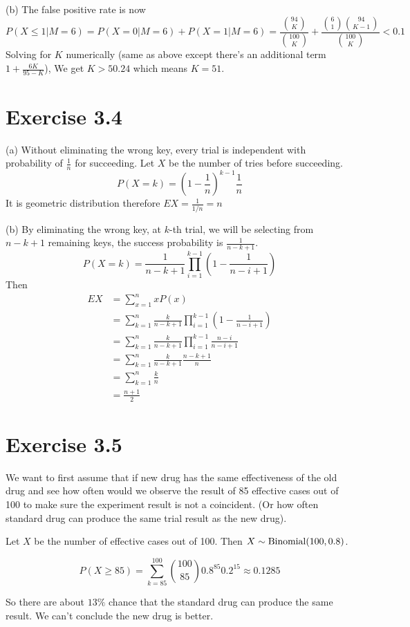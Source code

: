 \documentclass[12pt]{article}
\begin{document}
(b)
The false positive rate is now 
$$P(X\leq 1 | M = 6) = P(X=0|M=6) + P(X=1|M=6)=  \frac{{94 \choose K}}{{100 \choose K}} +  \frac{{6 \choose 1}{94 \choose K-1}}{{100 \choose K}} < 0.1 $$
Solving for $K$ numerically (same as above except there's an additional term $1 + \frac{6K}{95-K}$), We get $K > 50.24$ which means $K=51$.

\section*{Exercise 3.4}
(a) Without eliminating the wrong key, every trial is independent with probability of $\frac{1}{n}$ for succeeding. Let $X$ be the number of tries before succeeding. 
$$P(X=k) = \left(1 - \frac{1}{n}\right)^{k-1} \frac{1}{n}$$
It is geometric distribution therefore $EX = \frac{1}{1/n} = n$

(b) By eliminating the wrong key, at $k$-th trial, we will be selecting from $n - k + 1$ remaining keys, the success probability is $\frac{1}{n-k+1}$. 
$$P(X=k) = \frac{1}{n-k+1} \prod^{k-1}_{i=1} \left(1- \frac{1}{n-i+1} \right)$$
Then
$$\begin{aligned}
EX &= \sum_{x=1}^{n} xP(x) \\
   &= \sum_{k=1}^{n} \frac{k}{n-k+1} \prod^{k-1}_{i=1} \left(1- \frac{1}{n-i+1} \right) \\
   &= \sum_{k=1}^{n} \frac{k}{n-k+1} \prod^{k-1}_{i=1} \frac{n -i}{n-i+1} \\
   &= \sum_{k=1}^{n} \frac{k}{n-k+1} \frac{n - k + 1}{n} \\
   &= \sum_{k=1}^{n} \frac{k}{n} \\
   &= \frac{n+1}{2}
\end{aligned}$$

\section*{Exercise 3.5}
We want to first assume that if new drug has the same effectiveness of the old drug and see how often would we observe the result of 85 effective cases out of 100 to make sure the experiment result is not a coincident. (Or how often standard drug can produce the same trial result as the new drug).

Let $X$ be the number of effective cases out of 100. Then $X \sim \mathrm{Binomial} (100, 0.8)$.

$$P(X \geq 85) = \sum^{100}_{k=85}{100 \choose 85} 0.8^{85} 0.2^{15} \approx 0.1285$$

So there are about $13\%$ chance that the standard drug can produce the same result. We can't conclude the new drug is better.
\end{document}
